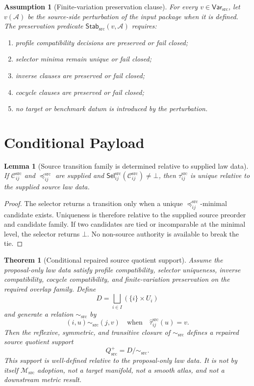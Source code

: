 \documentclass[11pt]{article}
\newcommand{\Msrc}{\mathcal{M}_{\mathrm{src}}}
\newcommand{\Cand}{\mathcal{C}^{\mathrm{src}}}
\newcommand{\Sel}{\mathsf{Sel}^{\mathrm{src}}}
\newcommand{\Tau}{\widehat{\tau}^{\mathrm{src}}}
\newcommand{\Var}{\mathsf{Var}_{\mathrm{src}}}
\newcommand{\Stab}{\mathsf{Stab}_{\mathrm{src}}}
\newcommand{\Qsrc}{Q_{\mathrm{src}}^{+}}
\newcommand{\Bot}{\bot}
\newtheorem{assumption}{Assumption}
\newtheorem{lemma}{Lemma}
\newtheorem{theorem}{Theorem}
\begin{document}
\begin{assumption}[Finite-variation preservation clause]
For every \(v\in\Var\), let \(v(\mathcal A)\) be the source-side perturbation
of the input package when it is defined. The preservation predicate
\(\Stab(v,\mathcal A)\) requires:
\begin{enumerate}
  \item profile compatibility decisions are preserved or fail closed;
  \item selector minima remain unique or fail closed;
  \item inverse clauses are preserved or fail closed;
  \item cocycle clauses are preserved or fail closed;
  \item no target or benchmark datum is introduced by the perturbation.
\end{enumerate}
\end{assumption}

\section{Conditional Payload}

\begin{lemma}[Source transition family is determined relative to supplied law data]
If \(\Cand_{ij}\) and \(\preceq^{\mathrm{src}}_{ij}\) are supplied and
\(\Sel_{ij}(\Cand_{ij})\neq\Bot\), then \(\Tau_{ij}\) is unique relative to
the supplied source law data.
\end{lemma}

\begin{proof}
The selector returns a transition only when a unique
\(\preceq^{\mathrm{src}}_{ij}\)-minimal candidate exists. Uniqueness is
therefore relative to the supplied source preorder and candidate family. If
two candidates are tied or incomparable at the minimal level, the selector
returns \(\Bot\). No non-source authority is available to break the tie.
\end{proof}

\begin{theorem}[Conditional repaired source quotient support]
Assume the proposal-only law data satisfy profile compatibility, selector
uniqueness, inverse compatibility, cocycle compatibility, and finite-variation
preservation on the required overlap family. Define
\[
  D=\bigsqcup_{i\in I}(\{i\}\times U_i)
\]
and generate a relation \(\sim_{\mathrm{src}}\) by
\[
  (i,u)\sim_{\mathrm{src}}(j,v)
  \quad\text{when}\quad
  \Tau_{ij}(u)=v.
\]
Then the reflexive, symmetric, and transitive closure of
\(\sim_{\mathrm{src}}\) defines a repaired source quotient support
\[
  \Qsrc=D/{\sim_{\mathrm{src}}}.
\]
This support is well-defined relative to the proposal-only law data. It is not
by itself \(\Msrc\) adoption, not a target manifold, not a smooth atlas, and
not a downstream metric result.
\end{theorem}
\end{document}
